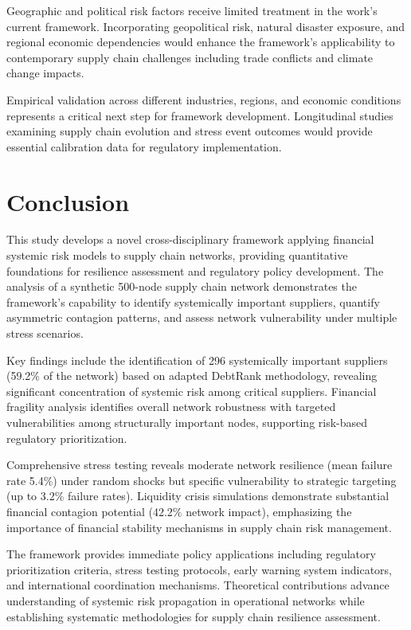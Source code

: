 \documentclass[a4 paper, 11pt,twoside]{article}
\newcommand{\0}{\Bf{0}}
\theoremstyle{definition}
\begin{document}
Geographic and political risk factors receive limited treatment in the work's current framework. Incorporating geopolitical risk, natural disaster exposure, and regional economic dependencies would enhance the framework's applicability to contemporary supply chain challenges including trade conflicts and climate change impacts.

Empirical validation across different industries, regions, and economic conditions represents a critical next step for framework development. Longitudinal studies examining supply chain evolution and stress event outcomes would provide essential calibration data for regulatory implementation.

\section{Conclusion}

This study develops a novel cross-disciplinary framework applying financial systemic risk models to supply chain networks, providing quantitative foundations for resilience assessment and regulatory policy development. The analysis of a synthetic 500-node supply chain network demonstrates the framework's capability to identify systemically important suppliers, quantify asymmetric contagion patterns, and assess network vulnerability under multiple stress scenarios.

Key findings include the identification of 296 systemically important suppliers (59.2\% of the network) based on adapted DebtRank methodology, revealing significant concentration of systemic risk among critical suppliers. Financial fragility analysis identifies overall network robustness with targeted vulnerabilities among structurally important nodes, supporting risk-based regulatory prioritization.

Comprehensive stress testing reveals moderate network resilience (mean failure rate 5.4\%) under random shocks but specific vulnerability to strategic targeting (up to 3.2\% failure rates). Liquidity crisis simulations demonstrate substantial financial contagion potential (42.2\% network impact), emphasizing the importance of financial stability mechanisms in supply chain risk management.

The framework provides immediate policy applications including regulatory prioritization criteria, stress testing protocols, early warning system indicators, and international coordination mechanisms. Theoretical contributions advance understanding of systemic risk propagation in operational networks while establishing systematic methodologies for supply chain resilience assessment.
\end{document}
